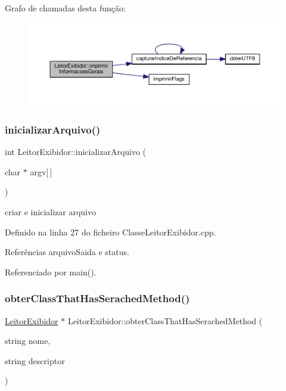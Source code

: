 Grafo de chamadas desta função\+:
\nopagebreak
\begin{figure}[H]
\begin{center}
\leavevmode
\includegraphics[width=350pt]{classLeitorExibidor_a338627a08235ffe50ede3d9e023c1238_cgraph}
\end{center}
\end{figure}
\mbox{\label{classLeitorExibidor_a185520372593c9ee066d72c67e4a38e6}} 
\subsubsection{\texorpdfstring{inicializar\+Arquivo()}{inicializarArquivo()}}
{\footnotesize\ttfamily int Leitor\+Exibidor\+::inicializar\+Arquivo (\begin{DoxyParamCaption}\item[{char $\ast$}]{argv\mbox{[}$\,$\mbox{]} }\end{DoxyParamCaption})}



criar e inicializar arquivo 



Definido na linha 27 do ficheiro Classe\+Leitor\+Exibidor.\+cpp.



Referências arquivo\+Saida e status.



Referenciado por main().

\mbox{\label{classLeitorExibidor_a3893e9478688cf21b293536da48f9f14}} 
\subsubsection{\texorpdfstring{obter\+Class\+That\+Has\+Serached\+Method()}{obterClassThatHasSerachedMethod()}}
{\footnotesize\ttfamily \hyperlink{classLeitorExibidor}{Leitor\+Exibidor} $\ast$ Leitor\+Exibidor\+::obter\+Class\+That\+Has\+Serached\+Method (\begin{DoxyParamCaption}\item[{string}]{nome,  }\item[{string}]{descriptor }\end{DoxyParamCaption})}



